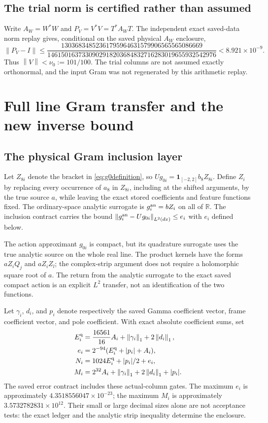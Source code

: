 \documentclass[11pt,a4paper]{article}
\numberwithin{equation}{section}
\theoremstyle{definition}\newtheorem{definition}[theorem]{Definition}
\theoremstyle{remark}\newtheorem{remark}[theorem]{Remark}
\newcommand{\R}{\mathbb R}
\newcommand{\norm}[1]{\left\|#1\right\|}
\begin{document}
\subsection{The trial norm is certified rather than assumed}
Write $A_W=W^*W$ and $P_V=V^*V=T^*A_WT$. The independent exact saved-data norm replay gives, conditional on the saved physical $A_W$ enclosure,
\begin{equation}\label{eq:norm64}
 \norm{P_V-I}\le
 \frac{13036834852361795964631579906565565086669}
 {1461501637330902918203684832716283019655932542976}
 <8.921\times10^{-9}.
\end{equation}
Thus $\norm V<\nu_0:=101/100$. The trial columns are not assumed exactly orthonormal, and the input Gram was not regenerated by this arithmetic replay.

\section{Full line Gram transfer and the new inverse bound}\label{sec:affine32}
\subsection{The physical Gram inclusion layer}
Let $Z_{8i}$ denote the bracket in \eqref{eq:g0definition}, so $Ug_{0i}=\mathbf1_{[-2,2]}b_8Z_{8i}$. Define $Z_i$ by replacing every occurrence of $a_8$ in $Z_{8i}$, including at the shifted arguments, by the true source $a$, while leaving the exact stored coefficients and feature functions fixed. The ordinary-space analytic surrogate is $g_i^{\rm an}=bZ_i$ on all of $\R$. The inclusion contract carries the bound $\norm{g_i^{\rm an}-Ug_{0i}}_{L^2(dx)}\le e_i$ with $e_i$ defined below.

The action approximant $g_{0i}$ is compact, but its quadrature surrogate uses the true analytic source on the whole real line. The product kernels have the forms $aZ_iQ_j$ and $aZ_iZ_l$; the complex-strip argument does not require a holomorphic square root of $a$. The return from the analytic surrogate to the exact saved compact action is an explicit $L^2$ transfer, not an identification of the two functions.

Let $\gamma_i$, $d_i$, and $p_i$ denote respectively the saved Gamma coefficient vector, frame coefficient vector, and pole coefficient. With exact absolute coefficient sums, set
\begin{align}\label{eq:quadmajor64}
 E_i^{\rm q}&=\frac{16561}{16}A_i+\norm{\gamma_i}_1+2\norm{d_i}_1,\nonumber\\
 e_i&=2^{-94}(E_i^{\rm q}+|p_i|+A_i),\\
 N_i&=1024E_i^{\rm q}+|p_i|/2+e_i,\nonumber\\
 M_i&=2^{32}A_i+\norm{\gamma_i}_1+2\norm{d_i}_1+|p_i|.\nonumber
\end{align}
The saved error contract includes these actual-column gates. The maximum $e_i$ is approximately $4.3518556047\times10^{-23}$; the maximum $M_i$ is approximately $3.5732782831\times10^{12}$. Their small or large decimal sizes alone are not acceptance tests: the exact ledger and the analytic strip inequality determine the enclosure.
\end{document}
